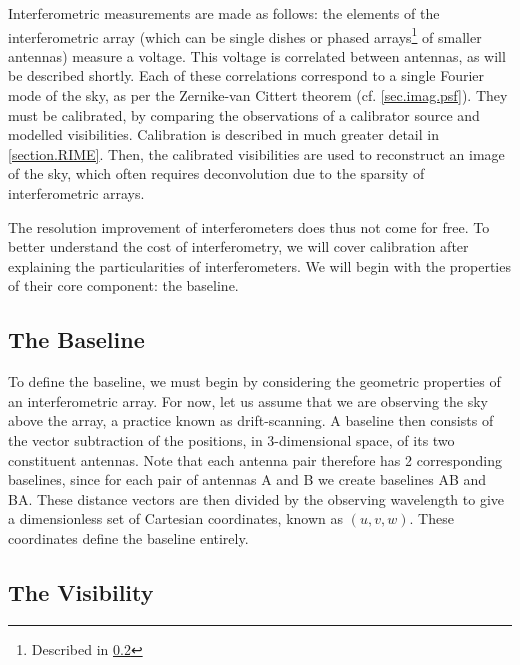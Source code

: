 \pg
Interferometric measurements are made as follows: the elements of the interferometric array (which can be single dishes or phased arrays\footnote{Described in \cref{sec.visibility}} of smaller antennas) measure a voltage. This voltage is correlated between antennas, as will be described shortly. Each of these correlations correspond to a single Fourier mode of the sky, as per the Zernike-van Cittert theorem (cf. \cref{sec.imag.psf}). They must be calibrated, by comparing the observations of a calibrator source and modelled visibilities. Calibration is described in much greater detail in \cref{section.RIME}. Then, the calibrated visibilities are used to reconstruct an image of the sky, which often requires deconvolution due to the sparsity of interferometric arrays.

\pg
The resolution improvement of interferometers does thus not come for free. To better understand the cost of interferometry, we will cover calibration after explaining the particularities of interferometers. We will begin with the properties of their core component: the baseline.

\subsection{The Baseline}

\pg
To define the baseline, we must begin by considering the geometric properties of an interferometric array. For now, let us assume that we are observing the sky above the array, a practice known as drift-scanning. A baseline then consists of the vector subtraction of the positions, in 3-dimensional space, of its two constituent antennas. Note that each antenna pair therefore has 2 corresponding baselines, since for each pair of antennas A and B we create baselines AB and BA. These distance vectors are then divided by the observing wavelength to give a dimensionless set of Cartesian coordinates, known as $(u,v,w)$. These coordinates define the baseline entirely. 

\subsection{The Visibility}\label{sec.visibility}

